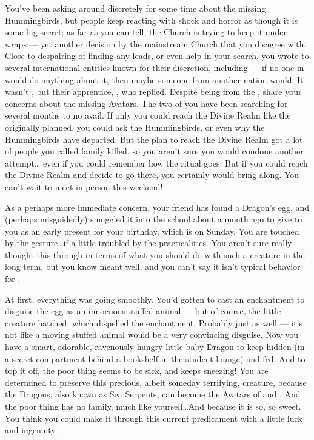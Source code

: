 \documentclass[char]{GL2020}
\begin{document}
{You've been asking around discretely for some time about the missing Hummingbirds, but people keep reacting with shock and horror as though it is some big secret; as far as you can tell, the Church is trying to keep it under wraps — yet another decision by the mainstream Church that you disagree with. Close to despairing of finding any leads, or even help in your search, you wrote to several international entities known for their discretion, including \cHeadDiplomat{\full} — if no one in \pFarm{}would do anything about it, then maybe someone from another nation would. It wasn't \cHeadDiplomat{}, but their apprentice, \cJuniorStatesman{\full}, who replied. Despite being from the \pShip{}, \cJuniorStatesman{\they} share\cJuniorStatesman{\verbs} your concerns about the missing Avatars. The two of you have been searching for several months to no avail. If only you could reach the Divine Realm like the \cDisneySect{} originally planned, you could ask the Hummingbirds, or even \cFarmGod{} \cFarmGod{\themself} why the Hummingbirds have departed. But the plan to reach the Divine Realm got a lot of people you called family killed, so you aren't sure you would condone another attempt\ldots{} even if you could remember how the ritual goes. But if you could reach the Divine Realm and decide to go there, you certainly would bring \cJuniorStatesman{} along. You can’t wait to meet \cJuniorStatesman{\them} in person this weekend!
 
As a perhaps more immediate concern, your friend \cPirateChild{} has found a Dragon's egg, and (perhaps misguidedly) smuggled it into the school about a month ago to give to you as an early present for your birthday, which is on Sunday.  You are touched by the gesture\ldots{}if a little troubled by the practicalities. You aren't sure \cPirateChild{} really thought this through in terms of what you should do with such a creature in the long term, but you know \cPirateChild{\they} meant well, and you can’t say it isn’t typical behavior for \cPirateChild{\them}.

At first, everything was going smoothly. You'd gotten \cAdopted{} to cast an enchantment to disguise the egg as an innocuous stuffed animal — but of course, the little creature hatched, which dispelled the enchantment. Probably just as well — it's not like a moving stuffed animal would be a very convincing disguise. Now you have a smart, adorable, ravenously hungry little baby Dragon to keep hidden (in a secret compartment behind a bookshelf in the student lounge) and fed. And to top it off, the poor thing seems to be sick, and keeps sneezing! You are determined to preserve this precious, albeit someday terrifying, creature, because the Dragons, also known as Sea Serpents, can become the Avatars of \cEbbFull{\full} and \cFlowFull{\full}. And the poor thing has no family, much like yourself\ldots{}And because it is so, so sweet. You think you could make it through this current predicament with a little luck and ingenuity.

}
\end{document}
